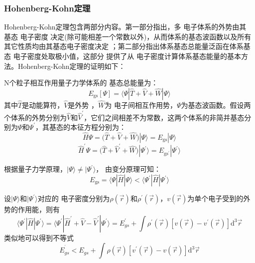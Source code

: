 \subsubsection{Hohenberg-Kohn定理}
Hohenberg-Kohn定理包含两部分{内容}。第一部分指出，多%
{电}子体系的外势由其%
基态%
{电}子密度%
决定(除可能相差一个常数以外)，从而体系的基态波函数以及所有其它性质均由其基态电子密度决定
；第二部分指出体系基态总能量{泛函}在体系基态%
{电}子密度处取极小{值}，这部分%
{提供}了从%
{电}子密度计算体系基态能量的基本方法。Hohenberg-Kohn定理的证明如下：

N个粒子相互作用量子力学体系的%
{基态总能量}为：
\begin{equation}
	{E_{\mathrm{gs}}[\Psi]}%
=\langle\Psi%
|\hat{T}+\hat{V}+\hat{W}|\Psi%
\rangle
	\label{eq:DFT_01}
\end{equation}
其中$\hat{T}$是动能算符，$\hat{V}$是外势%
，$\hat{W}$为%
{电}子间相互作用势{，$\Psi$为基态波函数}。假设两个体系的外势分别为$\hat{V}$和$\hat V^{\prime}$，它们之间相差不为常数，这两个体系的非简并基态分别为$\Psi$和$\Psi^{\prime}$，其基态的本征方程分别为：
$${\hat H\Psi=}\bigl(\hat{T}+\hat{V}+\hat{W}\bigr)|\Psi\rangle=E_{\mathrm{gs}}|\Psi\rangle$$
$${\hat H^{\prime}\Psi=}\bigl(\hat{T}+\hat V^{\prime}+\hat{W}\bigr)|\Psi^{\prime}\rangle=E_{\mathrm{gs}^{\prime}}|\Psi^{\prime}\rangle$$

{根据量子力学原理，}$|\Psi\rangle{\neq}|\Psi^{\prime}\rangle$，%
由变分原理可知：
$$E_{\mathrm{gs}}=\langle\Psi|\hat{H}|\Psi\rangle<\langle\Psi^{\prime}|\hat{H}|\Psi^{\prime}\rangle$$

设$|\Psi\rangle$和$|\Psi^{\prime}\rangle$对应的%
{电}子密度分别为$\rho(\vec{r})
$和$\rho^{\prime}(\vec{r})$，{$v(\vec r)$为单个电子受到的外势的作用能，则}有
$$\langle\Psi^{\prime}|\hat{H}|\Psi^{\prime}\rangle=\langle\Psi^{\prime}|\hat H^{\prime}+\hat{V}-\hat V^{\prime}|\Psi^{\prime}\rangle=E^{\prime}_{gs}+\int{\rho^{\prime}(\vec{r})[v(\vec{r})-v^{\prime}(\vec{r})]\textrm{d}^3\vec{r}}$$
{类似地}可以得到不等式
$$E^{^{\prime}}_{gs}<E_{gs}+\int{\rho(\vec{r})[v^{\prime}(\vec{r})-v(\vec{r})]\textrm{d}^{3}\vec{r}}$$

